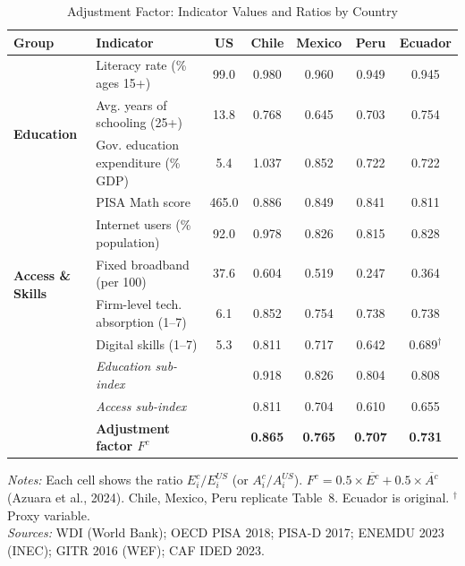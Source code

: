 \begin{table}[htbp]
\centering
\caption{Adjustment Factor: Indicator Values and Ratios by Country}
\label{tab:adjustment_factors}
\small
\begin{tabular}{llccccc}
\toprule
Group & Indicator & US & Chile & Mexico & Peru & Ecuador \\
\midrule
\multirow{4}{*}{\textbf{Education}}
 & Literacy rate (\% ages 15+) & 99.0 & 0.980 & 0.960 & 0.949 & 0.945 \\
 & Avg. years of schooling (25+) & 13.8 & 0.768 & 0.645 & 0.703 & 0.754 \\
 & Gov. education expenditure (\% GDP) & 5.4 & 1.037 & 0.852 & 0.722 & 0.722 \\
 & PISA Math score & 465.0 & 0.886 & 0.849 & 0.841 & 0.811 \\
\midrule
\multirow{4}{*}{\textbf{Access \& Skills}}
 & Internet users (\% population) & 92.0 & 0.978 & 0.826 & 0.815 & 0.828 \\
 & Fixed broadband (per 100) & 37.6 & 0.604 & 0.519 & 0.247 & 0.364 \\
 & Firm-level tech. absorption (1--7) & 6.1 & 0.852 & 0.754 & 0.738 & 0.738 \\
 & Digital skills (1--7) & 5.3 & 0.811 & 0.717 & 0.642 & 0.689$^{\dagger}$ \\
\midrule
 & \textit{Education sub-index} &  & 0.918 & 0.826 & 0.804 & 0.808 \\
 & \textit{Access sub-index} &  & 0.811 & 0.704 & 0.610 & 0.655 \\
\midrule
 & \textbf{Adjustment factor $F^c$} &  & \textbf{0.865} & \textbf{0.765} & \textbf{0.707} & \textbf{0.731} \\
\bottomrule
\end{tabular}
\vspace{2mm}
\begin{minipage}{\textwidth}
\footnotesize
\textit{Notes:} Each cell shows the ratio $E_i^c / E_i^{US}$ (or $A_i^c / A_i^{US}$). $F^c = 0.5 \times \overline{E^c} + 0.5 \times \overline{A^c}$ (Azuara et al., 2024). Chile, Mexico, Peru replicate Table~8. Ecuador is original. $^{\dagger}$Proxy variable. \\
\textit{Sources:} WDI (World Bank); OECD PISA 2018; PISA-D 2017; ENEMDU 2023 (INEC); GITR 2016 (WEF); CAF IDED 2023.
\end{minipage}
\end{table}